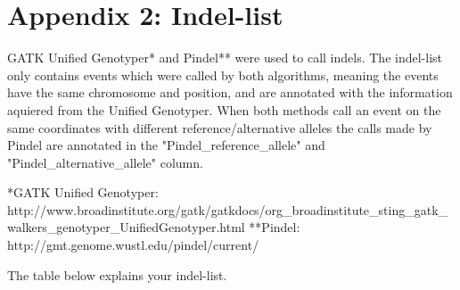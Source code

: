 \documentclass[a4paper,12pt]{article}
\begin{document}
\clearpage
\section*{Appendix 2: Indel-list}
GATK Unified Genotyper* and Pindel** were used to call indels. The indel-list only contains events which were called by both algorithms, meaning the events have the same chromosome and position, and are annotated with the information aquiered from the Unified Genotyper. When both methods call an event on the same coordinates with different reference/alternative alleles the calls made by Pindel are annotated in the "Pindel_reference_allele" and "Pindel_alternative_allele" column.

*GATK Unified Genotyper: http://www.broadinstitute.org/gatk/gatkdocs/org_broadinstitute_sting_gatk_walkers_genotyper_UnifiedGenotyper.html **Pindel: http://gmt.genome.wustl.edu/pindel/current/

The table below explains your indel-list.\\
\end{document}
